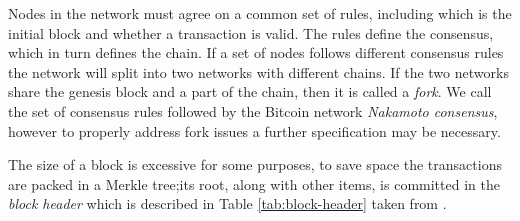 Nodes in the network must agree on a common set of rules, including which is the initial block and whether a transaction is valid. The rules define the consensus, which in turn defines the chain. If a set of nodes follows different consensus rules the network will split into two networks with different chains. If the two networks share the genesis block and a part of the chain, then it is called a \textit{fork}. We call the set of consensus rules followed by the Bitcoin network \textit{Nakamoto consensus}, however to properly address fork issues a further specification may be necessary. 

The size of a block is excessive for some purposes, to save space the transactions are packed in a Merkle tree;its root, along with other items, is committed in the \textit{block header} which is described in Table \ref{tab:block-header} taken from \cite{BitcoinDev}.


